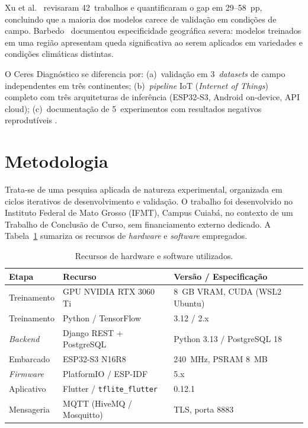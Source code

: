 \documentclass[12pt]{article}
\begin{document}
Xu et al.~\cite{xu2024} revisaram 42~trabalhos e quantificaram o gap em 29--58~pp,
concluindo que a maioria dos modelos carece de validação em condições de campo.
Barbedo~\cite{barbedo2019} documentou especificidade geográfica severa: modelos
treinados em uma região apresentam queda significativa ao serem aplicados em
variedades e condições climáticas distintas.

O Ceres Diagnóstico se diferencia por: (a)~validação em 3~\textit{datasets} de campo
independentes em três continentes; (b)~\textit{pipeline} IoT (\textit{Internet of
Things}) completo com três arquiteturas de inferência (ESP32-S3, Android on-device,
API cloud); (c)~documentação de
5~experimentos com resultados negativos reprodutíveis \cite{pineau2021}.


\section{Metodologia}

Trata-se de uma pesquisa aplicada de natureza experimental, organizada em ciclos
iterativos de desenvolvimento e validação. O trabalho foi desenvolvido no Instituto
Federal de Mato Grosso (IFMT), Campus Cuiabá, no contexto de um Trabalho de
Conclusão de Curso, sem financiamento externo dedicado. A Tabela~\ref{tab:recursos}
sumariza os recursos de \textit{hardware} e \textit{software} empregados.

\begin{table}[ht]
\centering
\caption{Recursos de hardware e software utilizados.}
\label{tab:recursos}
\begin{tabular}{@{}lll@{}}
\toprule
\textbf{Etapa} & \textbf{Recurso} & \textbf{Versão / Especificação} \\
\midrule
Treinamento  & GPU NVIDIA RTX 3060 Ti           & 8~GB VRAM, CUDA (WSL2 Ubuntu) \\
Treinamento  & Python / TensorFlow              & 3.12 / 2.x \\
\textit{Backend} & Django REST + PostgreSQL      & Python 3.13 / PostgreSQL 18 \\
Embarcado    & ESP32-S3 N16R8                   & 240~MHz, PSRAM 8~MB \\
\textit{Firmware} & PlatformIO / ESP-IDF         & 5.x \\
Aplicativo   & Flutter / \texttt{tflite\_flutter} & 0.12.1 \\
Mensageria   & MQTT (HiveMQ / Mosquitto)        & TLS, porta 8883 \\
\bottomrule
\end{tabular}
\end{table}
\end{document}
